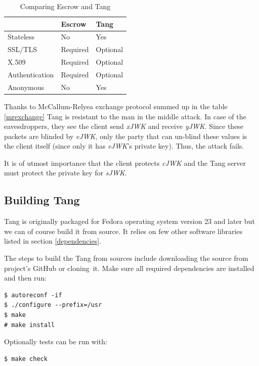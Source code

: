 \begin{table}[h]
\centering
\label{compare}
\begin{tabular}{@{}lll@{}}
\toprule
               & Escrow   & Tang                         \\ \midrule
Stateless      & No       & Yes                          \\
SSL/TLS        & Required & Optional                     \\
X.509          & Required & Optional                     \\
Authentication & Required & Optional                     \\
Anonymous      & No       & Yes                          \\ \bottomrule
\end{tabular}
\caption{Comparing Escrow and Tang}
\end{table}

Thanks to McCallum-Relyea exchange protocol summed up in the table \ref{mrexchange} Tang is resistant to the man in the middle attack.
In case of the eavesdroppers, they see the client send {\it xJWK} and receive {\it yJWK}.
Since these packets are blinded by {\it eJWK}, only the party that can un-blind these values is the client itself (since only it has {\it eJWK}'s private key).
Thus, the attack fails.

It is of utmost importance that the client protects {\it cJWK} and the Tang server must protect the private key for {\it sJWK}.



\subsection{Building Tang}

Tang is originally packaged for Fedora operating system version 23 and later but we can of course build it from source.
It relies on few other software libraries listed in section \ref{dependencies}.

The steps to build the Tang from sources include downloading the source from project's GitHub or cloning~it.
Make sure all required dependencies are installed and then run:
\begin{lstlisting}[columns=fixed,basicstyle=\ttfamily\footnotesize,tabsize=4,backgroundcolor=\color{yellow!10}]
$ autoreconf -if
$ ./configure --prefix=/usr
$ make
# make install
\end{lstlisting}
Optionally tests can be run with:
\begin{lstlisting}[columns=fixed,basicstyle=\ttfamily\footnotesize,tabsize=4,backgroundcolor=\color{yellow!10}]
$ make check
\end{lstlisting}



